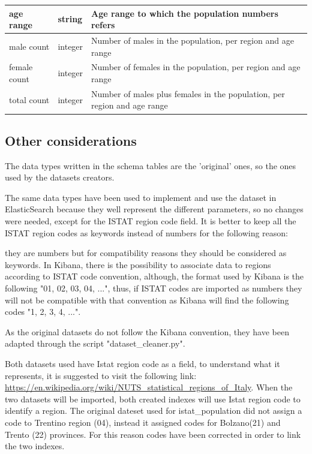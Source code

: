 \documentclass{article}
\begin{document}
\newpage
\begin{center}
\begin{tabular}{ |m{4cm}|m{2cm}|m{4.5cm}|}
\hline
  age range & string & Age range to which the population numbers refers\\
    \hline
  male count & integer & Number of males in the population, per region and age range\\
    \hline

  female count & integer & Number of females in the population, per region and age range\\
    \hline
  total count & integer & Number of males plus females in the population, per region and age range\\
    \hline
  \end{tabular}
\end{center}
\hfill\break

\subsection{Other considerations}
The data types written in the schema tables are the 'original' ones, so the ones used by the datasets creators.

The same data types have been used to implement and use the dataset in ElasticSearch because they well represent the different parameters, so no changes were needed, except for the ISTAT region code field.
It is better to keep all the ISTAT region codes as keywords instead of numbers for the following reason:

they are numbers but for compatibility reasons they should be considered as keywords. In Kibana, there is the possibility to associate data to regions according to ISTAT code convention, although, the format used by Kibana is the following "01, 02, 03, 04, ...", thus, if ISTAT codes are imported as numbers they will not be compatible with that convention as Kibana will find the following codes "1, 2, 3, 4, ...".

As the original datasets do not follow the Kibana convention, they have been adapted through the script {\selectfont"dataset\_cleaner.py"}.

\hfill\break
Both datasets used have Istat region code as a field, to understand what it represents, it is suggested to visit the following link: \\ \url{https://en.wikipedia.org/wiki/NUTS\_statistical\_regions\_of\_Italy}.
\hfill\break
\hfill\break
When the two datasets will be imported, both created indexes will use Istat region code to identify a region. The original dateset used for istat\_population did not assign a code to Trentino region (04), instead it assigned codes for Bolzano(21) and Trento (22) provinces. For this reason codes have been corrected in order to link the two indexes.
\end{document}
